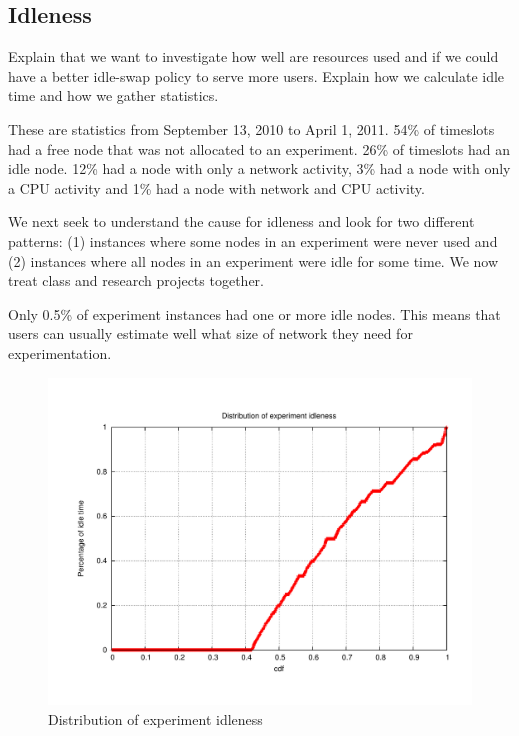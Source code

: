 \documentclass[10pt]{article}
\begin{document}
\subsection{Idleness}
{\color{red} Explain that we want to investigate how well are resources used and if we could have a better idle-swap policy to serve more users. }
{\color{red} Explain how we calculate idle time and how we gather statistics. }

These are statistics from September 13, 2010 to April 1, 2011. 
54\% of timeslots had a free node that was not allocated to an experiment. 
26\% of timeslots had an idle node. 12\% had a node with only a network activity,
3\% had a node with only a CPU activity and 1\% had a node with network and CPU activity.

We next seek to understand the cause for idleness and look for two different patterns: (1) instances where some nodes 
in an experiment were never used and (2) instances where all nodes in an experiment were idle for some time. We now treat
class and research projects together.

Only 0.5\% of experiment instances had one or more idle nodes. This means that users can usually estimate well 
what size of network they need for experimentation. 

\begin{figure}[htbp]
\begin{center}
\includegraphics[width=5in]{figs/timeidle.pdf}
\caption{Distribution of experiment idleness}
\label{timeidle}
\end{center}
\end{figure}
\end{document}
